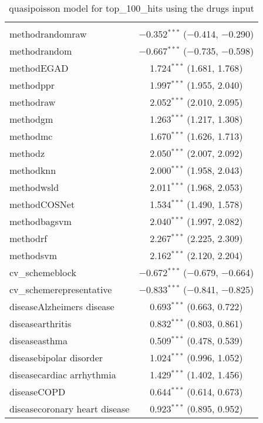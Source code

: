 
\begin{table}[!htbp] \centering 
  \caption{quasipoisson model for top_100_hits using the drugs input} 
  \label{} 
\begin{tabular}{@{\extracolsep{5pt}}lc} 
\\[-1.8ex]\hline 
\hline \\[-1.8ex] 
 methodrandomraw & $-$0.352$^{***}$ ($-$0.414, $-$0.290) \\ 
  methodrandom & $-$0.667$^{***}$ ($-$0.735, $-$0.598) \\ 
  methodEGAD & 1.724$^{***}$ (1.681, 1.768) \\ 
  methodppr & 1.997$^{***}$ (1.955, 2.040) \\ 
  methodraw & 2.052$^{***}$ (2.010, 2.095) \\ 
  methodgm & 1.263$^{***}$ (1.217, 1.308) \\ 
  methodmc & 1.670$^{***}$ (1.626, 1.713) \\ 
  methodz & 2.050$^{***}$ (2.007, 2.092) \\ 
  methodknn & 2.000$^{***}$ (1.958, 2.043) \\ 
  methodwsld & 2.011$^{***}$ (1.968, 2.053) \\ 
  methodCOSNet & 1.534$^{***}$ (1.490, 1.578) \\ 
  methodbagsvm & 2.040$^{***}$ (1.997, 2.082) \\ 
  methodrf & 2.267$^{***}$ (2.225, 2.309) \\ 
  methodsvm & 2.162$^{***}$ (2.120, 2.204) \\ 
  cv\_schemeblock & $-$0.672$^{***}$ ($-$0.679, $-$0.664) \\ 
  cv\_schemerepresentative & $-$0.833$^{***}$ ($-$0.841, $-$0.825) \\ 
  diseaseAlzheimers disease & 0.693$^{***}$ (0.663, 0.722) \\ 
  diseasearthritis & 0.832$^{***}$ (0.803, 0.861) \\ 
  diseaseasthma & 0.509$^{***}$ (0.478, 0.539) \\ 
  diseasebipolar disorder & 1.024$^{***}$ (0.996, 1.052) \\ 
  diseasecardiac arrhythmia & 1.429$^{***}$ (1.402, 1.456) \\ 
  diseaseCOPD & 0.644$^{***}$ (0.614, 0.673) \\ 
  diseasecoronary heart disease & 0.923$^{***}$ (0.895, 0.952) \\ 

\end{tabular}
\end{table}
